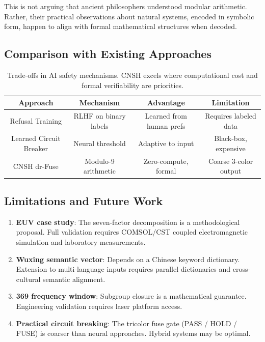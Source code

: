 \documentclass[twocolumn]{article}
\begin{document}
This is not arguing that ancient philosophers understood modular arithmetic. Rather, their practical observations about natural systems, encoded in symbolic form, happen to align with formal mathematical structures when decoded.

\subsection{Comparison with Existing Approaches}

\begin{table}[h]
\centering
\begin{tabular}{|c|c|c|c|}
\hline
Approach & Mechanism & Advantage & Limitation \\
\hline
Refusal Training & RLHF on binary labels & Learned from human prefs & Requires labeled data \\
\hline
Learned Circuit Breaker & Neural threshold & Adaptive to input & Black-box, expensive \\
\hline
CNSH dr-Fuse & Modulo-9 arithmetic & Zero-compute, formal & Coarse 3-color output \\
\hline
\end{tabular}
\caption{Trade-offs in AI safety mechanisms. CNSH excels where computational cost and formal verifiability are priorities.}
\end{table}

\subsection{Limitations and Future Work}

\begin{enumerate}
  \item \textbf{EUV case study}: The seven-factor decomposition is a methodological proposal. Full validation requires COMSOL/CST coupled electromagnetic simulation and laboratory measurements.

  \item \textbf{Wuxing semantic vector}: Depends on a Chinese keyword dictionary. Extension to multi-language inputs requires parallel dictionaries and cross-cultural semantic alignment.

  \item \textbf{369 frequency window}: Subgroup closure is a mathematical guarantee. Engineering validation requires laser platform access.

  \item \textbf{Practical circuit breaking}: The tricolor fuse gate (PASS / HOLD / FUSE) is coarser than neural approaches. Hybrid systems may be optimal.
\end{enumerate}
\end{document}
